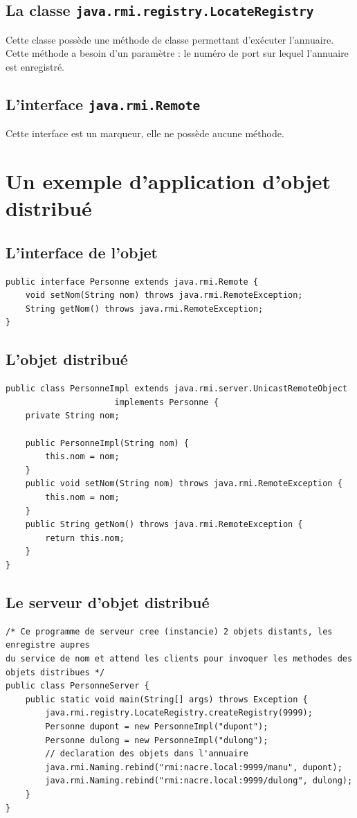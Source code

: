 \documentclass[a4paper,11pt]{report}
\begin{document}
\subsection{La classe \texttt{java.rmi.registry.LocateRegistry}}
Cette classe possède une méthode de classe permettant d'exécuter l'annuaire. Cette méthode a besoin d'un paramètre : le numéro de port sur lequel l'annuaire est enregistré.

\subsection{L\rq{}interface \texttt{java.rmi.Remote}}
Cette interface est un marqueur, elle ne possède aucune méthode.


\section{Un exemple d'application d'objet distribué}
\subsection{L'interface de l'objet}

\begin{lstlisting}
public interface Personne extends java.rmi.Remote {
	void setNom(String nom) throws java.rmi.RemoteException;
	String getNom() throws java.rmi.RemoteException;
}
\end{lstlisting}

\subsection{L'objet distribué}
\begin{lstlisting}
public class PersonneImpl extends java.rmi.server.UnicastRemoteObject
				      implements Personne {
  	private String nom;

	public PersonneImpl(String nom) {
		this.nom = nom;
	}
	public void setNom(String nom) throws java.rmi.RemoteException {
		this.nom = nom;
	}
	public String getNom() throws java.rmi.RemoteException {
		return this.nom;
	}
}

\end{lstlisting}


\subsection{Le serveur d'objet distribué}
\begin{lstlisting}
/* Ce programme de serveur cree (instancie) 2 objets distants, les enregistre aupres
du service de nom et attend les clients pour invoquer les methodes des objets distribues */
public class PersonneServer {
	public static void main(String[] args) throws Exception {
		java.rmi.registry.LocateRegistry.createRegistry(9999);
		Personne dupont = new PersonneImpl("dupont");
		Personne dulong = new PersonneImpl("dulong");
		// declaration des objets dans l'annuaire
		java.rmi.Naming.rebind("rmi:nacre.local:9999/manu", dupont);
		java.rmi.Naming.rebind("rmi:nacre.local:9999/dulong", dulong);
	}
}
\end{lstlisting}
\end{document}
